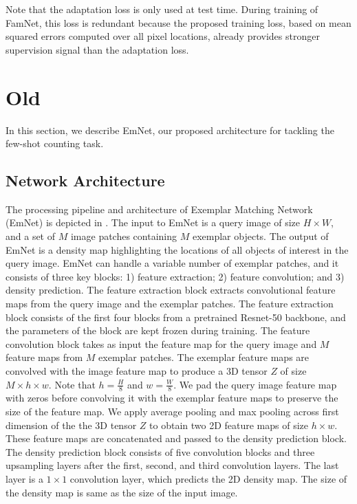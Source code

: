 Note that the adaptation loss is only used at test time. During training of FamNet, this loss is redundant because the proposed training loss, based on mean squared errors computed over all pixel locations, already provides stronger supervision signal than the adaptation loss. 

\iffalse
\section{Old}
In this section, we describe EmNet, our proposed architecture for tackling the few-shot counting task.

\subsection{Network Architecture}
The processing pipeline and architecture of Exemplar Matching Network (EmNet) is depicted in . The input to EmNet is a query image of size $H {\times} W$, and a set of $M$ image patches containing $M$ exemplar objects. The output of EmNet is a density map highlighting the locations of all objects of interest in the query image. EmNet can handle a variable number of exemplar patches, and it consists of three key blocks: 1) feature extraction; 2) feature convolution;  and 3) density prediction.  The feature extraction block extracts convolutional feature maps from the query image and the exemplar patches. The feature extraction block consists of the first four blocks from a pretrained Resnet-50 backbone, and the parameters of the block are kept frozen during training. The feature convolution block takes as input the feature map for the query image and $M$ feature maps from $M$ exemplar patches. The exemplar feature maps are convolved with the image feature map to produce a 3D tensor $Z$ of size $M{\times}h{\times}w$. Note that $h=\frac{H}{8}$ and $w = \frac{W}{8}$. We pad the query image feature map with zeros before convolving it with the exemplar feature maps to preserve the size of the feature map. We apply average pooling and max pooling across first dimension of the the 3D tensor $Z$ to obtain two 2D feature maps of size $h{\times}w$. These feature maps are concatenated and passed to the density prediction block. The density prediction block consists of five convolution blocks and three upsampling layers after the first, second, and third convolution layers. The last layer is a $1{\times}1$ convolution layer, which predicts the 2D density map. The size of the density map is same as the size of the input image.

